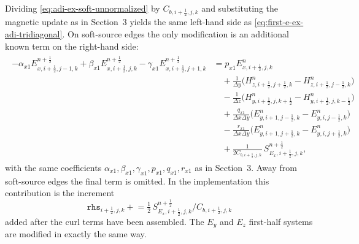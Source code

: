 \documentclass{article}
\numberwithin{equation}{section}
\numberwithin{figure}{section}
\begin{document}
Dividing \eqref{eq:adi-ex-soft-unnormalized} by $C_{b,i+\tfrac12,j,k}$ and substituting the magnetic update as in Section~3 yields the same left-hand side as \eqref{eq:first-e-ex-adi-tridiagonal}. On soft-source edges the only modification is an additional known term on the right-hand side:
\begin{align}
    \begin{split}
        -\alpha_{x1}E_{x,i+\tfrac12,j-1,k}^{n+\frac12}
        + \beta_{x1}E_{x,i+\tfrac12,j,k}^{n+\frac12}
        - \gamma_{x1}E_{x,i+\tfrac12,j+1,k}^{n+\frac12}
         & = p_{x1}E_{x,i+\tfrac12,j,k}^{n}                                                                       \\
         & \quad +\frac{1}{\Delta y}\Big(H_{z,i+\tfrac12,j+\tfrac12,k}^{n}-H_{z,i+\tfrac12,j-\tfrac12,k}^{n}\Big) \\
         & \quad -\frac{1}{\Delta z}\Big(H_{y,i+\tfrac12,j,k+\tfrac12}^{n}-H_{y,i+\tfrac12,j,k-\tfrac12}^{n}\Big) \\
         & \quad +\frac{q_{x1}}{\Delta x\Delta y}\Big(E_{y,i+1,j-\tfrac12,k}^{n}-E_{y,i,j-\tfrac12,k}^{n}\Big)    \\
         & \quad -\frac{r_{x1}}{\Delta x\Delta y}\Big(E_{y,i+1,j+\tfrac12,k}^{n}-E_{y,i,j+\tfrac12,k}^{n}\Big)    \\
         & \quad +\frac{1}{2C_{b,i+\tfrac12,j,k}}\,S_{E_x,i+\tfrac12,j,k}^{n+\frac12},
    \end{split}
    \label{eq:first-e-ex-adi-tridiagonal-excitation}
\end{align}
with the same coefficients $\alpha_{x1},\beta_{x1},\gamma_{x1},p_{x1},q_{x1},r_{x1}$ as in Section~3. Away from soft-source edges the final term is omitted. In the implementation this contribution is the increment
\begin{equation}
    \texttt{rhs}_{i+\tfrac12,j,k} \mathrel{+}= \tfrac12\,S_{E_x,i+\tfrac12,j,k}^{n+\frac12}/C_{b,i+\tfrac12,j,k}
\end{equation}
added after the curl terms have been assembled. The $E_y$ and $E_z$ first-half systems are modified in exactly the same way.
\end{document}
